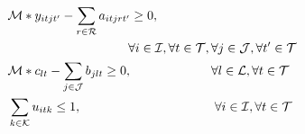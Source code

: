 \documentclass[conference]{IEEEtran}
\begin{document}
\begin{align}
\label{eq:DUOneandOnly2} 
\\
&\mathcal{M} * y_{itjt'} -\sum\limits_{r\in\mathcal{R}} a_{itjrt'} \geq 0, \notag \\
&\;\;\qquad\qquad\qquad\qquad\quad\forall i\in\mathcal{I},\forall t\in\mathcal{T}, \forall j\in\mathcal{J}, \forall t'\in\mathcal{T}
\label{eq:YandA} 
\\
&\mathcal{M} * c_{lt} - \sum\limits_{j\in\mathcal{J}} b_{jlt} \geq 0,\;\qquad\qquad\qquad\forall l\in\mathcal{L},\forall t\in\mathcal{T}
\label{eq:DUswitch} 
\\
&\sum\limits_{k\in\mathcal{K}}  u_{itk} \leq 1, \;\;\qquad\qquad\qquad\qquad\qquad\forall i\in\mathcal{I},\forall t\in\mathcal{T}
\label{eq:trafficOneandOnly} 
\end{align}
\end{document}
